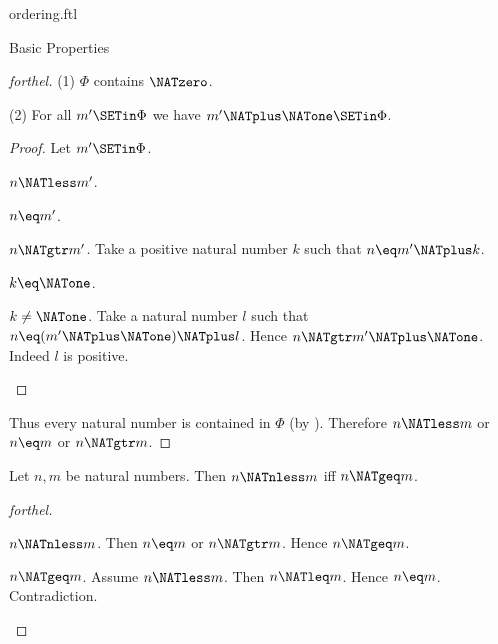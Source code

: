 \documentclass{naproche-library}
\begin{document}
\begin{smodule}[title=The Standard Ordering of the Natural Numbers]{ordering.ftl}
\begin{sfragment}{Basic Properties}
\begin{proof}[forthel]
    (1) $\Phi$ contains $\NATzero$.

    (2) For all $m' \SETin \Phi$ we have $m' \NATplus \NATone \SETin \Phi$.
    \begin{proof}
      Let $m' \SETin \Phi$.

      \begin{case}{$n \NATless m'$.} \end{case}

      \begin{case}{$n \eq m'$.} \end{case}

      \begin{case}{$n \NATgtr m'$.}
        Take a positive natural number $k$ such that $n \eq m' \NATplus k$.

        \begin{case}{$k \eq \NATone$.} \end{case}

        \begin{case}{$k \neq \NATone$.}
          Take a natural number $l$ such that $n \eq (m' \NATplus \NATone) \NATplus l$.
          Hence $n \NATgtr m' \NATplus \NATone$.
          Indeed $l$ is positive.
        \end{case}
      \end{case}
    \end{proof}

    Thus every natural number is contained in $\Phi$ (by ).
    Therefore $n \NATless m$ or $n \eq m$ or $n \NATgtr m$.
  \end{proof}

  \begin{proposition}[forthel,id=ARITHMETIC_04_6991525988794368]
    Let $n, m$ be natural numbers.
    Then $n \NATnless m$ iff $n \NATgeq m$.
  \end{proposition}
  \begin{proof}[forthel]
    \begin{case}{$n \NATnless m$.}
      Then $n \eq m$ or $n \NATgtr m$.
      Hence $n \NATgeq m$.
    \end{case}

    \begin{case}{$n \NATgeq m$.}
      Assume $n \NATless m$.
      Then $n \NATleq m$.
      Hence $n \eq m$.
      Contradiction.
    \end{case}
  \end{proof}
\end{sfragment}


\end{smodule}
\end{document}
